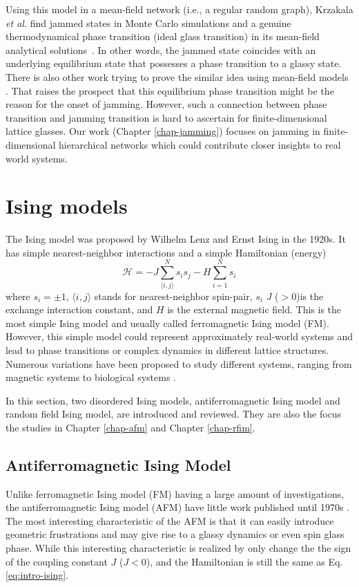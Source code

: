 Using this model in a mean-field network 
(i.e., a regular random graph), Krzakala \textit{et al.} find
jammed states in Monte Carlo simulations and a genuine thermodynamical
phase transition (ideal glass transition) in its mean-field analytical
solutions~\cite{Krzakala2008}. In other words, the jammed state coincides
with an underlying equilibrium state that possesses a phase transition
to a glassy state. There is also other work trying to prove the similar idea using mean-field models \cite{Rivoire03,berthier2011theory, Parisi2010}. That raises the prospect that this equilibrium phase transition might be the reason for the onset of jamming. However, such a connection between phase transition and jamming transition is hard to ascertain for finite-dimensional lattice glasses. Our work (Chapter \ref{chap-jamming}) focuses on jamming in finite-dimensional hierarchical networks which could contribute closer insights to real world systems.



\section{Ising models}
The Ising model was proposed by Wilhelm Lenz and Ernst Ising \cite{ising1925contribution, brush1967history} in the 1920s. It has simple nearest-neighbor interactions and a simple Hamiltonian (energy)
\begin{equation}
\mathcal{H}=-J \sum_{\langle i, j\rangle}^N s_i s_j - H \sum_{i=1}^N s_i
\label{eq:intro-ising}
\end{equation}
where $s_i=\pm1$, $\langle i, j\rangle$ stands for nearest-neighbor spin-pair, $s_i$ $J$ ($>0$)is the exchange interaction constant, and $H$ is the external magnetic field. This is the most simple Ising model and usually called ferromagnetic Ising model (FM).
However, this simple model could represent approximately real-world systems and lead to phase transitions \cite{onsager1944} or complex dynamics \cite{Fredrickson1984} in different lattice structures. 
Numerous variations have been proposed to study different systems, ranging from magnetic systems \cite{blundell2001magnetism} to biological systems \cite{hopfield1982neural}.

In this section, two disordered Ising models, antiferromagnetic Ising model and random field Ising model,  are introduced and reviewed. They are also the focus the studies in Chapter \ref{chap-afm} and Chapter \ref{chap-rfim}.
\subsection{Antiferromagnetic Ising Model}
\label{sec:intro-afm}
Unlike ferromagnetic Ising model (FM) having a large amount of investigations, the antiferromagnetic Ising model (AFM) have little work published until 1970s \cite{penney2003new}. The most interesting characteristic of the AFM is that it can easily introduce geometric frustrations and may give rise to a glassy dynamics or even spin glass phase. While this interesting characteristic is realized by only change the the sign of the coupling constant $J$ ($J<0$), and the Hamiltonian is still the same as Eq. \ref{eq:intro-ising}.



